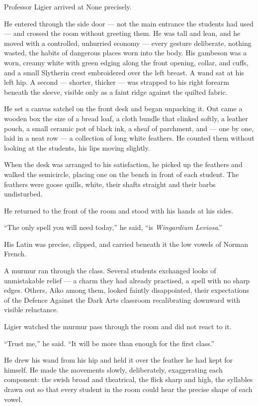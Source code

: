 Professor Ligier arrived at None precisely.
 
He entered through the side door --- not the main entrance the students had used --- and crossed the room without greeting them. He was tall and lean, and he moved with a controlled, unhurried economy --- every gesture deliberate, nothing wasted, the habits of dangerous places worn into the body. His gambeson was a worn, creamy white with green edging along the front opening, collar, and cuffs, and a small Slytherin crest embroidered over the left breast. A wand sat at his left hip. A second --- shorter, thicker --- was strapped to his right forearm beneath the sleeve, visible only as a faint ridge against the quilted fabric.
 
He set a canvas satchel on the front desk and began unpacking it. Out came a wooden box the size of a bread loaf, a cloth bundle that clinked softly, a leather pouch, a small ceramic pot of black ink, a sheaf of parchment, and --- one by one, laid in a neat row --- a collection of long white feathers. He counted them without looking at the students, his lips moving slightly.
 
When the desk was arranged to his satisfaction, he picked up the feathers and walked the semicircle, placing one on the bench in front of each student. The feathers were goose quills, white, their shafts straight and their barbs undisturbed. 
 
He returned to the front of the room and stood with his hands at his sides.
 
\enquote{The only spell you will need today,} he said, \enquote{is \textit{Wingardium Leviosa}.}
 
His Latin was precise, clipped, and carried beneath it the low vowels of Norman French.
 
A murmur ran through the class. Several students exchanged looks of unmistakable relief --- a charm they had already practised, a spell with no sharp edges. Others, Aiko among them, looked faintly disappointed, their expectations of the Defence Against the Dark Arts classroom recalibrating downward with visible reluctance.
 
Ligier watched the murmur pass through the room and did not react to it.
 
\enquote{Trust me,} he said. \enquote{It will be more than enough for the first class.}
 
He drew his wand from his hip and held it over the feather he had kept for himself. He made the movements slowly, deliberately, exaggerating each component: the swish broad and theatrical, the flick sharp and high, the syllables drawn out so that every student in the room could hear the precise shape of each vowel.
 
